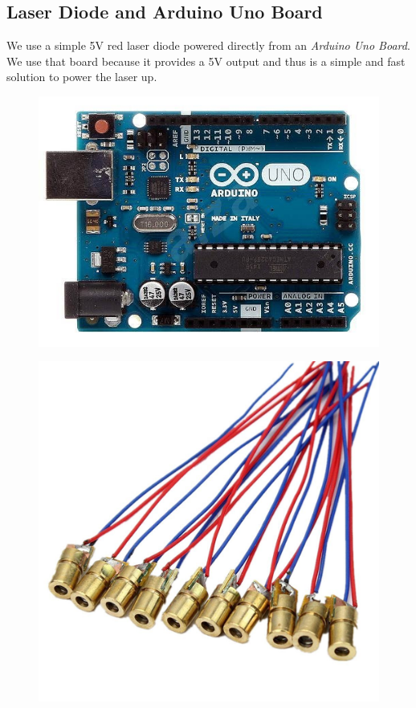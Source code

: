 \subsection{Laser Diode and Arduino Uno Board}
We use a simple 5V red laser diode powered directly from an \emph{Arduino Uno Board}. We use that board because it provides a 5V output and thus is a simple and fast solution to power the laser up.
\begin{figure}[h]
\centering
\begin{minipage}{.5\textwidth}
  \centering
  \includegraphics[width=\linewidth]{img/arduino.jpg}
  \label{fig:arduino}
\end{minipage}%
\begin{minipage}{.5\textwidth}
  \centering
  \includegraphics[width=.75\linewidth]{img/diode.jpg}
  \label{fig:diode}
\end{minipage}
\end{figure}
\clearpage
